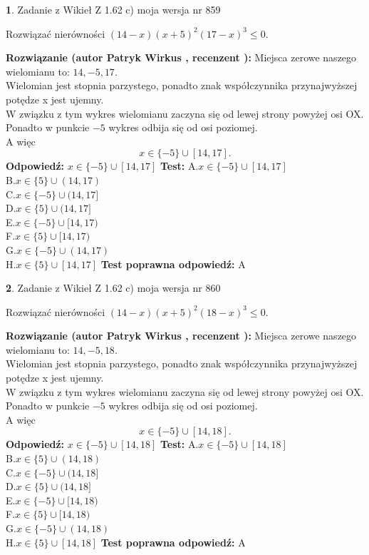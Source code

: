 \documentclass[12pt, a4paper]{article}
\theoremstyle{definition} %
\newtheorem{zad}{}
\newcommand{\zadStart}[1]{\begin{zad}#1\newline}
\newcommand{\zadStop}{\end{zad}}
\newcommand{\rozwStart}[2]{\noindent \textbf{Rozwiązanie (autor #1 , recenzent #2): }\newline}
\newcommand{\rozwStop}{\newline}
\newcommand{\odpStart}{\noindent \textbf{Odpowiedź:}\newline}
\newcommand{\odpStop}{\newline}
\newcommand{\testStart}{\noindent \textbf{Test:}\newline}
\newcommand{\testStop}{\newline}
\newcommand{\kluczStart}{\noindent \textbf{Test poprawna odpowiedź:}\newline}
\newcommand{\kluczStop}{\newline}
\begin{document}
\zadStart{Zadanie z Wikieł Z 1.62 c) moja wersja nr 859}

Rozwiązać nierówności $(14-x)(x+5)^{2}(17-x)^{3}\le0$.
\zadStop
\rozwStart{Patryk Wirkus}{}
Miejsca zerowe naszego wielomianu to: $14, -5, 17$.\\
Wielomian jest stopnia parzystego, ponadto znak współczynnika przy\linebreak najwyższej potędze x jest ujemny.\\ W związku z tym wykres wielomianu zaczyna się od lewej strony powyżej osi OX.\\
Ponadto w punkcie $-5$ wykres odbija się od osi poziomej.\\
A więc $$x \in \{-5\} \cup [14,17].$$
\rozwStop
\odpStart
$x \in \{-5\} \cup [14,17]$
\odpStop
\testStart
A.$x \in \{-5\} \cup [14,17]$\\
B.$x \in \{5\} \cup (14,17)$\\
C.$x \in \{-5\} \cup (14,17]$\\
D.$x \in \{5\} \cup (14,17]$\\
E.$x \in \{-5\} \cup [14,17)$\\
F.$x \in \{5\} \cup [14,17)$\\
G.$x \in \{-5\} \cup (14,17)$\\
H.$x \in \{5\} \cup [14,17]$
\testStop
\kluczStart
A
\kluczStop



\zadStart{Zadanie z Wikieł Z 1.62 c) moja wersja nr 860}

Rozwiązać nierówności $(14-x)(x+5)^{2}(18-x)^{3}\le0$.
\zadStop
\rozwStart{Patryk Wirkus}{}
Miejsca zerowe naszego wielomianu to: $14, -5, 18$.\\
Wielomian jest stopnia parzystego, ponadto znak współczynnika przy\linebreak najwyższej potędze x jest ujemny.\\ W związku z tym wykres wielomianu zaczyna się od lewej strony powyżej osi OX.\\
Ponadto w punkcie $-5$ wykres odbija się od osi poziomej.\\
A więc $$x \in \{-5\} \cup [14,18].$$
\rozwStop
\odpStart
$x \in \{-5\} \cup [14,18]$
\odpStop
\testStart
A.$x \in \{-5\} \cup [14,18]$\\
B.$x \in \{5\} \cup (14,18)$\\
C.$x \in \{-5\} \cup (14,18]$\\
D.$x \in \{5\} \cup (14,18]$\\
E.$x \in \{-5\} \cup [14,18)$\\
F.$x \in \{5\} \cup [14,18)$\\
G.$x \in \{-5\} \cup (14,18)$\\
H.$x \in \{5\} \cup [14,18]$
\testStop
\kluczStart
A
\kluczStop
\end{document}
